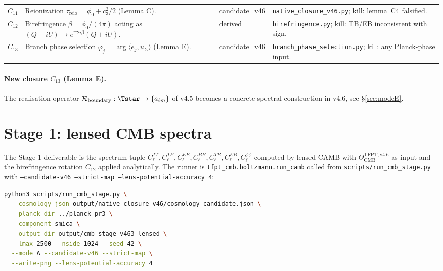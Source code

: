 \begin{center}
\begin{tabularx}{\textwidth}{@{}p{}p{}p{}Y@{}}
\(C_{11}\) & Reionization \(\tau_{\mathrm{reio}}=\phi_0+c_3^2/2\) (Lemma C). & \textsf{candidate\_v46} & \texttt{native\_closure\_v46.py}; kill: lemma~C4 falsified. \\
\(C_{12}\) & Birefringence \(\beta=\phi_0/(4\pi)\) acting as \((Q\pm iU)\to e^{\mp 2i\beta}(Q\pm iU)\). & derived & \texttt{birefringence.py}; kill: TB/EB inconsistent with sign. \\
\midrule
\(C_{13}\) & Branch phase selection \(\varphi_j=\arg\langle e_j,u_\Sigma\rangle\) (Lemma E). & \textsf{candidate\_v46} & \texttt{branch\_phase\_selection.py}; kill: any Planck-phase input. \\
\bottomrule
\end{tabularx}
\end{center}

\paragraph{New closure \(C_{13}\) (Lemma E).} The realisation operator
\(\mathcal R_{\mathrm{boundary}}:\Tstar\to\{a_{\ell m}\}\) of v4.5
becomes a concrete spectral construction in v4.6, see
\S\ref{sec:modeE}.

\section{Stage 1: lensed CMB spectra}
\label{sec:stage1}

The Stage-1 deliverable is the spectrum tuple
\(C_\ell^{TT}, C_\ell^{TE}, C_\ell^{EE}, C_\ell^{BB},
C_\ell^{TB}, C_\ell^{EB}, C_\ell^{\phi\phi}\) computed by lensed CAMB
with \(\Theta_{\mathrm{CMB}}^{\mathrm{TFPT,v4.6}}\) as input and the
birefringence rotation \(C_{12}\) applied analytically.  The runner is
\texttt{tfpt\_cmb.boltzmann.run\_camb} called from
\texttt{scripts/run\_cmb\_stage.py} with
\texttt{--candidate-v46\,--strict-map\,--lens-potential-accuracy\,4}:

\begin{lstlisting}[language=bash]
python3 scripts/run_cmb_stage.py \
  --cosmology-json output/native_closure_v46/cosmology_candidate.json \
  --planck-dir ../planck_pr3 \
  --component smica \
  --output-dir output/cmb_stage_v463_lensed \
  --lmax 2500 --nside 1024 --seed 42 \
  --mode A --candidate-v46 --strict-map \
  --write-png --lens-potential-accuracy 4
\end{lstlisting}

